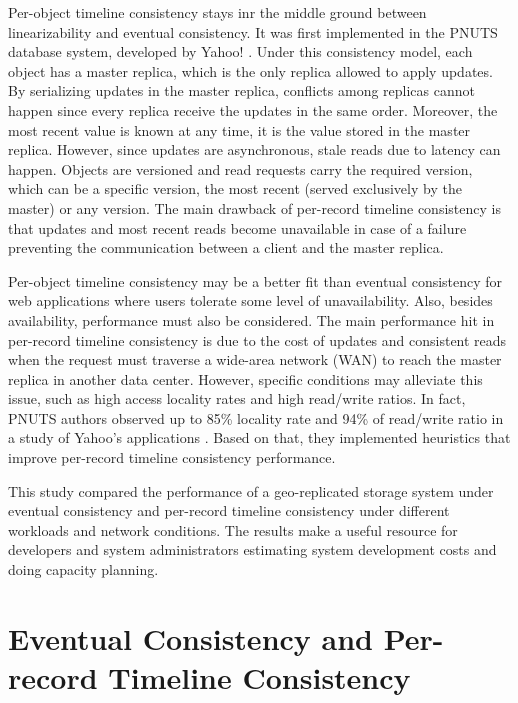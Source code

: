 \documentclass[doublespacing]{bmcart}
\begin{document}
Per-object timeline consistency stays inr the middle ground between
linearizability \cite{Herlihy1990} and eventual consistency. It was first
implemented in the PNUTS database system, developed by Yahoo!
\cite{Cooper2008}. Under this consistency model, each object has a master
replica, which is the only replica allowed to apply updates. By serializing
updates in the master replica, conflicts among replicas cannot happen since
every replica receive the updates in the same order. Moreover, the most recent
value is known at any time, it is the value stored in the master replica.
However, since updates are asynchronous, stale reads due to latency can happen.
Objects are versioned and read requests carry the required version, which can
be a specific version, the most recent (served exclusively by the master) or
any version. The main drawback of per-record timeline consistency is that
updates and most recent reads become unavailable in case of a failure
preventing the communication between a client and the master replica.

Per-object timeline consistency may be a better fit than eventual consistency
for web applications where users tolerate some level of unavailability. Also,
besides availability, performance must also be considered. The main performance
hit in per-record timeline consistency is due to the cost of updates and
consistent reads when the request must traverse a wide-area network (WAN) to
reach the master replica in another data center. However, specific conditions
may alleviate this issue, such as high access locality rates and high
read/write ratios. In fact, PNUTS authors observed up to 85\% locality rate and
94\% of read/write ratio in a study of Yahoo's applications \cite{Cooper2008,
Kadambi2011}. Based on that, they implemented heuristics that improve
per-record timeline consistency performance.

This study compared the performance of a geo-replicated storage system under
eventual consistency and per-record timeline consistency under different
workloads and network conditions. The results make a useful resource for
developers and system administrators estimating system development costs and
doing capacity planning.

\section{Eventual Consistency and Per-record Timeline Consistency}
\end{document}
